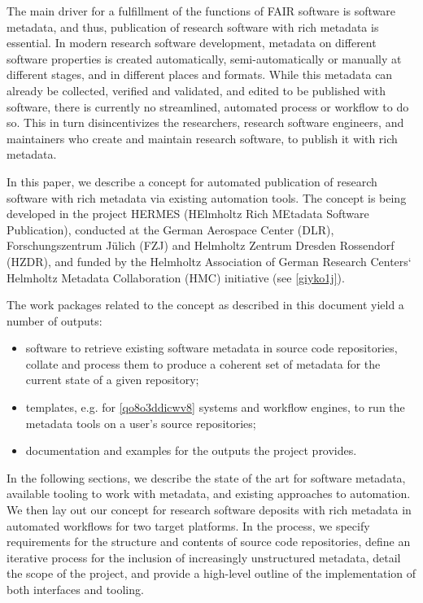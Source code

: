 \documentclass{article}
\begin{document}
The main driver for a fulfillment of the functions of FAIR software \cite{138880/DPXVI66D} is software metadata, and thus, publication of research software with rich metadata is essential. In modern research software development, metadata on different software properties is created automatically, semi-automatically or manually at different stages, and in different places and formats. While this metadata can already be collected, verified and validated, and edited to be published with software, there is currently no streamlined, automated process or workflow to do so. This in turn disincentivizes the researchers, research software engineers, and maintainers who create and maintain research software, to publish it with rich metadata.

In this paper, we describe a concept for automated publication of research software with rich metadata via existing automation tools. The concept is being developed in the project HERMES (HElmholtz Rich MEtadata Software Publication), conducted at the German Aerospace Center (DLR), Forschungszentrum Jülich (FZJ) and Helmholtz Zentrum Dresden Rossendorf (HZDR), and funded by the Helmholtz Association of German Research Centers‘ Helmholtz Metadata Collaboration (HMC) initiative (see \ref{giyko1j}).

The work packages related to the concept as described in this document yield a number of outputs: 

\begin{itemize}
  \item software to retrieve existing software metadata in source code repositories, collate and process them to produce a coherent set of metadata for the current state of a given repository;
  \item templates, e.g. for \ref{qo8o3ddicwv8} systems and workflow engines, to run the metadata tools on a user’s source repositories;
  \item documentation and examples for the outputs the project provides.
\end{itemize}

In the following sections, we describe the state of the art for software metadata, available tooling to work with metadata, and existing approaches to automation. We then lay out our concept for research software deposits with rich metadata in automated workflows for two target platforms. In the process, we specify requirements for the structure and contents of source code repositories, define an iterative process for the inclusion of increasingly unstructured metadata, detail the scope of the project, and provide a high-level outline of the implementation of both interfaces and tooling. 
\end{document}
